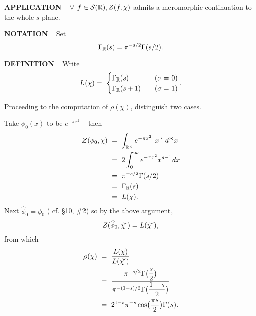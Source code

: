 \vspace{0.1cm}


\begin{x}{\small\bf APPLICATION} \ %
$\forall$ $f \in \mathcal{S}(\mathbb{R}), Z(f,\chi)$ admits a meromorphic continuation to the whole $s$-plane.
\end{x}

\vspace{0.1cm}



\begin{x}{\small\bf NOTATION} \ %
Set
\[
\Gamma_{\mathbb{R}}(s) = \pi^{-s/2} \Gamma(s/2).
\]
\end{x}

\vspace{0.1cm}



\begin{x}{\small\bf DEFINITION} \ %
Write
\[L(\chi) =\ 
\begin{cases}
\Gamma_\R(s) &\quad (\sigma = 0)\\
\Gamma_\R(s+1) &\quad (\sigma = 1)
\end{cases}
.\]
\end{x}

\vspace{0.1cm}



Proceeding to the computation of $\rho(\chi)$, distinguish two cases.
\vspace{0.2cm}

\qquad \textbullet \quad {} \quad Take $\phi_0(x)$ to be $e^{-\pi x^2}$ $-$then
\begin{align*}
Z(\phi_0, \chi) \ 
&=\  \int_{\R^\times} e^{-\pi x^2} \abs{x}^s d^\times x\\	
&=\  2\int_0^\infty e^{-\pi x^2} x^{s-1} dx\\	
&=\  \pi^{-s/2} \Gamma(s/2) \\
&=\  \Gamma_\R(s)\\
&=\  L(\chi).
\end{align*}
Next $\widehat{\phi}_0 = \phi_0$ ( cf. \S10, \#2) so by the above argument,
\[
Z(\widehat{\phi}_0,\widecheck{\chi}) = L(\widecheck{\chi}),
\]
from which
\begin{align*}
\rho(\chi) \ 	
&=\  \frac{L(\chi)}{L(\widecheck{\chi})}\\	
&=\  \frac{\pi^{-s/2} \Gamma\bigl(\ds\frac{s}{2}\bigr)}{\pi^{-(1-s)/2} \Gamma\bigl(\ds\frac{1-s}{2}\bigr)}\\	
&=\  2^{1-s} \pi^{-s} \cos\bigl( \ds\frac{\pi s}{2}\bigr) \Gamma(s).
\end{align*}

